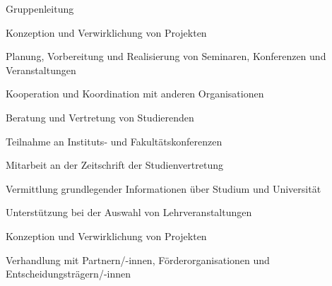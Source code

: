 

	{\begin{cvenumerate}
		\item Gruppenleitung
		\item Konzeption und Verwirklichung von Projekten
		\item Planung, Vorbereitung und Realisierung von Seminaren, Konferenzen und
		Veranstaltungen
		\item Kooperation und Koordination mit anderen Organisationen
	\end{cvenumerate}}

	{\begin{cvenumerate}
		\item Beratung und Vertretung von Studierenden
		\item Teilnahme an Instituts- und Fakultätskonferenzen
		\item Mitarbeit an der Zeitschrift der Studienvertretung
	\end{cvenumerate}}

\nopagebreak
{}
	{\begin{cvenumerate}
		\item Vermittlung grundlegender Informationen über Studium und Universität
		\item Unterstützung bei der Auswahl von Lehrveranstaltungen
	\end{cvenumerate}}

\nopagebreak
{}
	{\begin{cvenumerate}
		\item Konzeption und Verwirklichung von Projekten
		\item Verhandlung mit Partnern/-innen, Förderorganisationen und
		Entscheidungsträgern/-innen
	\end{cvenumerate}}